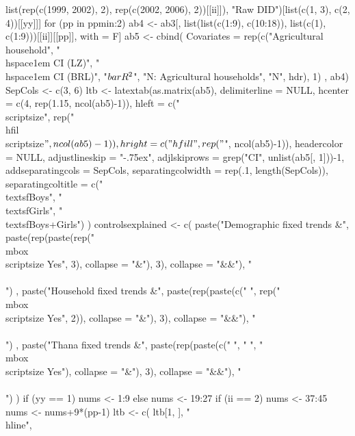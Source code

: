 \begin{Schunk}
\begin{Sinput}
{{       list(rep(c(1999, 2002), 2), rep(c(2002, 2006), 2))[[ii]]), "Raw DID")[list(c(1, 3), c(2, 4))[[yy]]]
    for (pp in ppmin:2) {
      ab4 <- ab3[, list(list(c(1:9), c(10:18)), list(c(1), c(1:9)))[[ii]][[pp]], with = F]
      ab5 <- cbind(
        Covariates = rep(c("Agricultural household", 
            "\\hspace{1em} CI (LZ)", 
            "\\hspace{1em} CI (BRL)", 
            "$\\bar{R}^{2}$", "N: Agricultural households", "N", hdr), 1)
        , ab4)
      SepCols <- c(3, 6)
      ltb <- latextab(as.matrix(ab5), delimiterline = NULL, 
          hcenter = c(4, rep(1.15, ncol(ab5)-1)),
          hleft = c("\\scriptsize", rep("\\hfil\\scriptsize$", ncol(ab5)-1)), 
          hright = c("\\hfill", rep("$", ncol(ab5)-1)),
          headercolor = NULL, 
          adjustlineskip = "-.75ex", adjlskiprows = grep("CI", unlist(ab5[, 1]))-1,
          addseparatingcols = SepCols, separatingcolwidth = rep(.1, length(SepCols)), 
          separatingcoltitle = c("\\textsf{Boys}", "\\textsf{Girls}", "\\textsf{Boys+Girls}")
        ) 
      controlsexplained <- c(
        paste("Demographic fixed trends &",  
          paste(rep(paste(rep("\\mbox{\\scriptsize Yes}", 3), collapse = "&"),  3), collapse = "&&"), "\\\\")
          , 
        paste("Household fixed trends &",  
          paste(rep(paste(c(" ", rep("\\mbox{\\scriptsize Yes}", 2)), collapse = "&"),  3), collapse = "&&"), "\\\\")
          ,
        paste("Thana fixed trends &",  
          paste(rep(paste(c(" ", " ", "\\mbox{\\scriptsize Yes}"), collapse = "&"),  3), collapse = "&&"), "\\\\")
        )
      if (yy == 1) nums <- 1:9 else nums <- 19:27
      if (ii == 2) nums <- 37:45
      nums <- nums+9*(pp-1)
      ltb <- c(
        ltb[1, ], "\\hline",
}}}
\end{Sinput}
\end{Schunk}
